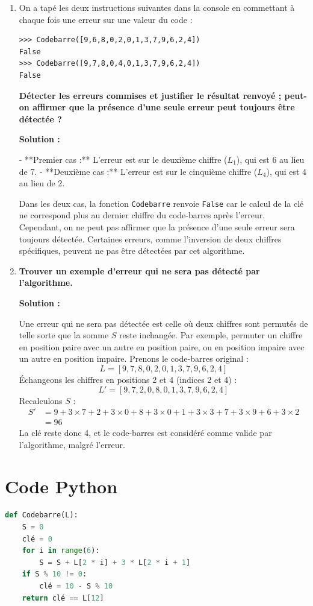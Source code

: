 \documentclass{article}
\begin{document}
\begin{enumerate}
\begin{enumerate}
    \end{enumerate}

    \item On a tapé les deux instructions suivantes dans la console en commettant à chaque fois une erreur sur une valeur du code :
    \begin{verbatim}
>>> Codebarre([9,6,8,0,2,0,1,3,7,9,6,2,4])
False
>>> Codebarre([9,7,8,0,4,0,1,3,7,9,6,2,4])
False
    \end{verbatim}

    \textbf{Détecter les erreurs commises et justifier le résultat renvoyé ; peut-on affirmer que la présence d’une seule erreur peut toujours être détectée ?}

    \textbf{Solution :}

    - **Premier cas :** L'erreur est sur le deuxième chiffre ($L_1$), qui est 6 au lieu de 7.
    - **Deuxième cas :** L'erreur est sur le cinquième chiffre ($L_4$), qui est 4 au lieu de 2.

    Dans les deux cas, la fonction \texttt{Codebarre} renvoie \texttt{False} car le calcul de la clé ne correspond plus au dernier chiffre du code-barres après l'erreur. Cependant, on ne peut pas affirmer que la présence d'une seule erreur sera toujours détectée. Certaines erreurs, comme l'inversion de deux chiffres spécifiques, peuvent ne pas être détectées par cet algorithme.

    \item \textbf{Trouver un exemple d’erreur qui ne sera pas détecté par l’algorithme.}

    \textbf{Solution :}

    Une erreur qui ne sera pas détectée est celle où deux chiffres sont permutés de telle sorte que la somme $S$ reste inchangée. Par exemple, permuter un chiffre en position paire avec un autre en position paire, ou en position impaire avec un autre en position impaire. Prenons le code-barres original :
    \[
    L = [9, 7, 8, 0, 2, 0, 1, 3, 7, 9, 6, 2, 4]
    \]
    Échangeons les chiffres en positions 2 et 4 (indices 2 et 4) :
    \[
    L' = [9, 7, 2, 0, 8, 0, 1, 3, 7, 9, 6, 2, 4]
    \]
    Recalculons $S$ :
    \begin{align*}
    S' &= 9 + 3 \times 7 + 2 + 3 \times 0 + 8 + 3 \times 0 + 1 + 3 \times 3 + 7 + 3 \times 9 + 6 + 3 \times 2 \\
    &= 96
    \end{align*}
    La clé reste donc 4, et le code-barres est considéré comme valide par l'algorithme, malgré l'erreur.

\end{enumerate}

\section*{Code Python}

\begin{lstlisting}[language=Python]
def Codebarre(L):
    S = 0
    clé = 0
    for i in range(6):
        S = S + L[2 * i] + 3 * L[2 * i + 1]
    if S % 10 != 0:
        clé = 10 - S % 10
    return clé == L[12]
\end{lstlisting}

\end{document}

